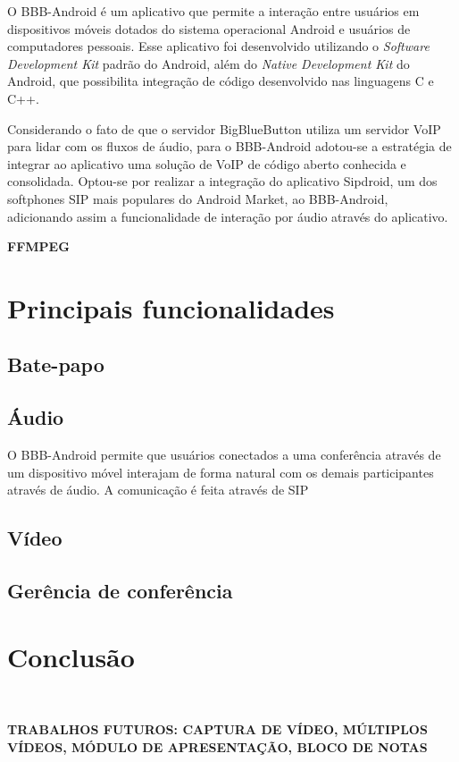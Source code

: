 \documentclass{acm_proc_article-sp}
\newcommand{\todo}[1]{\textcolor[rgb]{1.00,0.00,0.00}{\bf \uppercase{#1}}}
\begin{document}
O BBB-Android é um aplicativo que permite a interação entre usuários em dispositivos móveis dotados do sistema operacional Android e usuários de computadores pessoais. Esse aplicativo foi desenvolvido utilizando o \emph{Software Development Kit} padrão do Android, além do \emph{Native Development Kit} do Android, que possibilita integração de código desenvolvido nas linguagens C e C++.

Considerando o fato de que o servidor BigBlueButton utiliza um servidor VoIP para lidar com os fluxos de áudio, para o BBB-Android adotou-se a estratégia de integrar ao aplicativo uma solução de VoIP de código aberto conhecida e consolidada. Optou-se por realizar a integração do aplicativo Sipdroid, um dos softphones SIP mais populares do Android Market, ao BBB-Android, adicionando assim a funcionalidade de interação por áudio através do aplicativo.

\todo{FFmpeg}

\section{Principais funcionalidades}

\subsection{Bate-papo}

\subsection{Áudio}

O BBB-Android permite que usuários conectados a uma conferência através de um dispositivo móvel interajam de forma natural com os demais participantes através de áudio. A comunicação é feita através de SIP

\subsection{Vídeo}

\subsection{Gerência de conferência}

\section{Conclusão}~\cite{roesler_iva}

\todo{trabalhos futuros: captura de vídeo, múltiplos vídeos, módulo de apresentação, bloco de notas}
%

%
%
\balancecolumns
\end{document}
